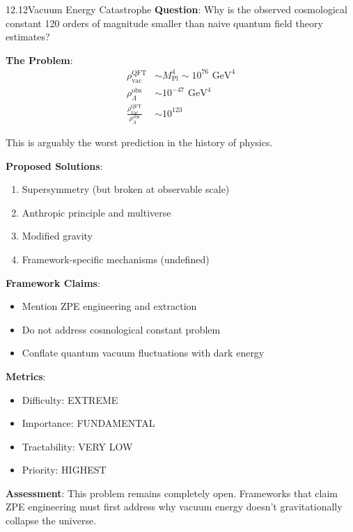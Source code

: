 \begin{openproblem}{12.12}{Vacuum Energy Catastrophe}
\textbf{Question}: Why is the observed cosmological constant 120 orders of magnitude smaller than naive quantum field theory estimates?

\textbf{The Problem}:
\begin{align}
\rho_{\text{vac}}^{\text{QFT}} &\sim M_{\text{Pl}}^4 \sim 10^{76} \text{ GeV}^4 \\
\rho_{\Lambda}^{\text{obs}} &\sim 10^{-47} \text{ GeV}^4 \\
\frac{\rho_{\text{vac}}^{\text{QFT}}}{\rho_{\Lambda}^{\text{obs}}} &\sim 10^{123}
\end{align}

This is arguably the worst prediction in the history of physics.

\textbf{Proposed Solutions}:
\begin{enumerate}
    \item Supersymmetry (but broken at observable scale)
    \item Anthropic principle and multiverse
    \item Modified gravity
    \item Framework-specific mechanisms (undefined)
\end{enumerate}

\textbf{Framework Claims}:
\begin{itemize}
    \item Mention ZPE engineering and extraction
    \item Do not address cosmological constant problem
    \item Conflate quantum vacuum fluctuations with dark energy
\end{itemize}

\textbf{Metrics}:
\begin{itemize}
    \item Difficulty: EXTREME
    \item Importance: FUNDAMENTAL
    \item Tractability: VERY LOW
    \item Priority: HIGHEST
\end{itemize}

\textbf{Assessment}: This problem remains completely open. Frameworks that claim ZPE engineering must first address why vacuum energy doesn't gravitationally collapse the universe.
\end{openproblem}

